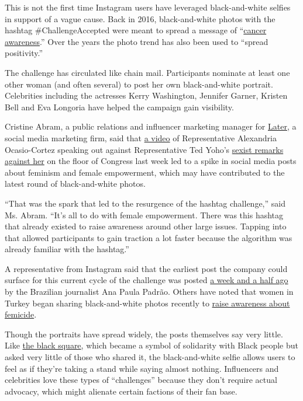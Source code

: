 This is not the first time Instagram users have leveraged
black-and-white selfies in support of a vague cause. Back in 2016,
black-and-white photos with the hashtag \#ChallengeAccepted were meant
to spread a message of
``\href{https://metro.co.uk/2016/08/29/what-is-the-black-and-white-photo-challenge-6097096/}{cancer
awareness}.'' Over the years the photo trend has also been used to
``spread positivity.''

The challenge has circulated like chain mail. Participants nominate at
least one other woman (and often several) to post her own
black-and-white portrait. Celebrities including the actresses Kerry
Washington, Jennifer Garner, Kristen Bell and Eva Longoria have helped
the campaign gain visibility.

Cristine Abram, a public relations and influencer marketing manager for
\href{https://later.com/}{Later}, a social media marketing firm, said
that
\href{https://www.nytimes.com/2020/07/23/us/alexandria-ocasio-cortez-sexism-congress.html}{a
video} of Representative Alexandria Ocasio-Cortez speaking out against
Representative Ted Yoho's
\href{https://www.nytimes.com/2020/07/25/sunday-review/aoc-daughters-ted-yoho.html}{sexist
remarks against her} on the floor of Congress last week led to a spike
in social media posts about feminism and female empowerment, which may
have contributed to the latest round of black-and-white photos.

``That was the spark that led to the resurgence of the hashtag
challenge,'' said Ms. Abram. ``It's all to do with female empowerment.
There was this hashtag that already existed to raise awareness around
other large issues. Tapping into that allowed participants to gain
traction a lot faster because the algorithm was already familiar with
the hashtag.''

A representative from Instagram said that the earliest post the company
could surface for this current cycle of the challenge was posted
\href{https://www.instagram.com/p/CCxGfzTBmXP/}{a week and a half ago}
by the Brazilian journalist Ana Paula Padrão. Others have noted that
women in Turkey began sharing black-and-white photos recently to
\href{https://twitter.com/imaann_patel/status/1288080743198068736?s=21}{raise
awareness about femicide}.

Though the portraits have spread widely, the posts themselves say very
little. Like
\href{https://www.nytimes.com/2020/06/02/arts/music/what-blackout-tuesday.html}{the
black square}, which became a symbol of solidarity with Black people but
asked very little of those who shared it, the black-and-white selfie
allows users to feel as if they're taking a stand while saying almost
nothing. Influencers and celebrities love these types of ``challenges''
because they don't require actual advocacy, which might alienate certain
factions of their fan base.

